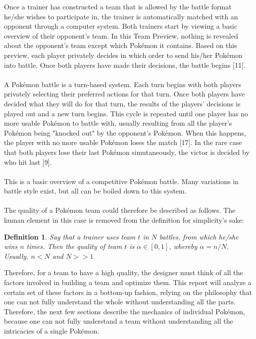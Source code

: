 \documentclass{article}
\newtheorem{definition}{Definition}
\begin{document}
Once a trainer has constructed a team that is allowed by the battle format he/she wishes to participate in, the trainer is automatically matched with an opponent through a computer system. Both trainers start by viewing a basic overview of their opponent's team. In this Team Preview, nothing is revealed about the opponent's team except which Pok\'emon it contains. Based on this preview, each player privately decides in which order to send his/her Pok\'emon into battle. Once both players have made their decisions, the battle begins [11].\\\\
A Pok\'emon battle is a turn-based system. Each turn begins with both players privately selecting their preferred actions for that turn. Once both players have decided what they will do for that turn, the results of the players' decisions is played out and a new turn begins. This cycle is repeated until one player has no more usable Pok\'emon to battle with, usually resulting from all the player's Pok\'emon being "knocked out" by the opponent's Pok\'emon. When this happens, the player with no more usable Pok\'emon loses the match [17]. In the rare case that both players lose their last Pok\'emon simutaneously, the victor is decided by who hit last [9].\\\\
This is a basic overview of a competitive Pok\'emon battle. Many variations in battle style exist, but all can be boiled down to this system.\\\\
The quality of a Pok\'emon team could therefore be described as follows. The human element in this case is removed from the definition for simplicity's sake:
\begin{definition}\label{QualityDef}
	Say that a trainer uses team $t$ in $N$ battles, from which he/she wins $n$ times. Then the quality of team $t$ is $\alpha\in[0,1]$, whereby $\alpha=n/N$. Usually, $n<N$ and $N>>1$ 
\end{definition}
Therefore, for a team to have a high quality, the designer must think of all the factors involved in building a team and optimize them. This report will analyze a certain set of these factors in a bottom-up fashion, relying on the philosophy that one can not fully understand the whole without understanding all the parts. Therefore, the next few sections describe the mechanics of individual Pok\'emon, because one can not fully understand a team without understanding all the intricacies of a single Pok\'emon.
\end{document}
